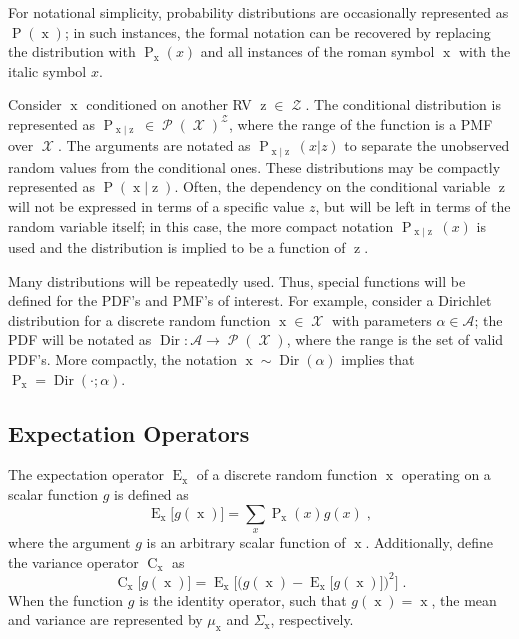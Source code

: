 \documentclass[12pt]{article}
\DeclareMathOperator{\xrm}{\mathrm{x}}
\DeclareMathOperator{\zrm}{\mathrm{z}}
\DeclareMathOperator{\Prm}{\mathrm{P}}
\DeclareMathOperator{\Erm}{\mathrm{E}}
\DeclareMathOperator{\Crm}{\mathrm{C}}
\DeclareMathOperator{\Xcal}{\mathcal{X}}
\DeclareMathOperator{\Zcal}{\mathcal{Z}}
\DeclareMathOperator{\Pcal}{\mathcal{P}}
\DeclareMathOperator{\Dir}{\mathrm{Dir}}
\begin{document}
For notational simplicity, probability distributions are occasionally represented as $\Prm(\xrm)$; in such instances, the formal notation can be recovered by replacing the distribution with $\Prm_{\xrm}(x)$ and all instances of the roman symbol $\xrm$ with the italic symbol $x$. 

Consider $\xrm$ conditioned on another RV $\zrm \in \Zcal$. The conditional distribution is represented as $\Prm_{\xrm | \zrm} \in \Pcal(\Xcal)^{\Zcal}$, where the range of the function is a PMF over $\Xcal$. The arguments are notated as $\Prm_{\xrm | \zrm}(x|z)$ to separate the unobserved random values from the conditional ones. These distributions may be compactly represented as $\Prm(\xrm|\zrm)$. Often, the dependency on the conditional variable $\zrm$ will not be expressed in terms of a specific value $z$, but will be left in terms of the random variable itself; in this case, the more compact notation $\Prm_{\xrm | \zrm}(x)$ is used and the distribution is implied to be a function of $\zrm$.

Many distributions will be repeatedly used. Thus, special functions will be defined for the PDF's and PMF's of interest. For example, consider a Dirichlet distribution for a discrete random function $\xrm \in \Xcal$ with parameters $\alpha \in \mathcal{A}$; the PDF will be notated as $\Dir : \mathcal{A} \to \Pcal(\Xcal)$, where the range is the set of valid PDF's. More compactly, the notation $\xrm \sim \Dir(\alpha)$ implies that $\Prm_{\xrm} = \Dir(\cdot ; \alpha)$.




\subsection*{Expectation Operators}

The expectation operator $\Erm_{\xrm}$ of a discrete random function $\xrm$ operating on a scalar function $g$ is defined as
\begin{equation}
\Erm_{\xrm}\big[ g(\xrm) \big] = \sum_{x} \Prm_{\xrm}(x) g(x) \;,
\end{equation}
where the argument $g$ is an arbitrary scalar function of $\xrm$. Additionally, define the variance operator $\Crm_{\xrm}$ as
\begin{equation}
\Crm_{\xrm}\big[g(\xrm)\big] = \Erm_{\xrm} \bigg[ \Big( g(\xrm) - \Erm_{\xrm}\big[g(\xrm)\big] \Big)^2 \bigg] \;.
\end{equation}
When the function $g$ is the identity operator, such that $g(\xrm) = \xrm$, the mean and variance are represented by $\mu_{\xrm}$ and $\Sigma_{\xrm}$, respectively.
\end{document}
